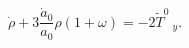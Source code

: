 \begin{equation}
\label{1eq9} \dot \rho +3 \frac{\dot a_0}{a_0}\rho(1+\omega)= -2
\tilde T^0~_y.
\end{equation}

